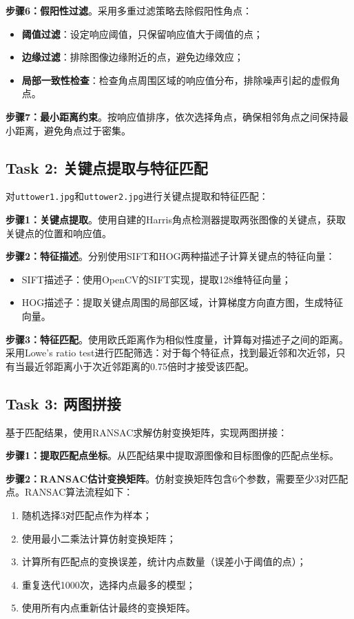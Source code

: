 \documentclass[a4paper]{article}
\begin{document}
\textbf{步骤6：假阳性过滤}。采用多重过滤策略去除假阳性角点：
\begin{itemize}
    \item \textbf{阈值过滤}：设定响应阈值，只保留响应值大于阈值的点；
    \item \textbf{边缘过滤}：排除图像边缘附近的点，避免边缘效应；
    \item \textbf{局部一致性检查}：检查角点周围区域的响应值分布，排除噪声引起的虚假角点。
\end{itemize}

\textbf{步骤7：最小距离约束}。按响应值排序，依次选择角点，确保相邻角点之间保持最小距离，避免角点过于密集。

\subsection{Task 2: 关键点提取与特征匹配}
对\texttt{uttower1.jpg}和\texttt{uttower2.jpg}进行关键点提取和特征匹配：

\textbf{步骤1：关键点提取}。使用自建的Harris角点检测器提取两张图像的关键点，获取关键点的位置和响应值。

\textbf{步骤2：特征描述}。分别使用SIFT和HOG两种描述子计算关键点的特征向量：
\begin{itemize}
    \item SIFT描述子：使用OpenCV的SIFT实现，提取128维特征向量；
    \item HOG描述子：提取关键点周围的局部区域，计算梯度方向直方图，生成特征向量。
\end{itemize}

\textbf{步骤3：特征匹配}。使用欧氏距离作为相似性度量，计算每对描述子之间的距离。采用Lowe's ratio test进行匹配筛选：对于每个特征点，找到最近邻和次近邻，只有当最近邻距离小于次近邻距离的0.75倍时才接受该匹配。

\subsection{Task 3: 两图拼接}
基于匹配结果，使用RANSAC求解仿射变换矩阵，实现两图拼接：

\textbf{步骤1：提取匹配点坐标}。从匹配结果中提取源图像和目标图像的匹配点坐标。

\textbf{步骤2：RANSAC估计变换矩阵}。仿射变换矩阵包含6个参数，需要至少3对匹配点。RANSAC算法流程如下：
\begin{enumerate}
    \item 随机选择3对匹配点作为样本；
    \item 使用最小二乘法计算仿射变换矩阵；
    \item 计算所有匹配点的变换误差，统计内点数量（误差小于阈值的点）；
    \item 重复迭代1000次，选择内点最多的模型；
    \item 使用所有内点重新估计最终的变换矩阵。
\end{enumerate}
\end{document}
